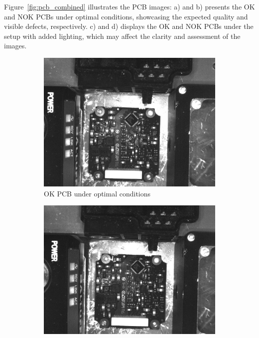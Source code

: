 \documentclass[12pt,DIV14,BCOR12mm,a4paper,footinclude=false,headinclude,parskip=half-,twoside,openright,cleardoublepage=empty,toc=index,bibliography=totoc,listof=totoc]{scrreprt}
\numberwithin{equation}{chapter}
\begin{document}
Figure~\ref{fig:pcb_combined} illustrates the PCB images: a) and b) presents the OK and NOK PCBs under optimal conditions, showcasing the expected quality and visible defects, respectively. c) and d) displays the OK and NOK PCBs under the setup with added lighting, which may affect the clarity and assessment of the images.
\begin{figure}
    \centering
    \begin{subfigure}[b]{0.45\textwidth}
        \centering
        \includegraphics[scale=0.15]{../media/PCB-optimal-OK.png}
        \caption{OK PCB under optimal conditions}
        \label{fig:pcb_optimal_ok}
    \end{subfigure}
    \hfill
    \begin{subfigure}[b]{0.45\textwidth}
        \centering
        \includegraphics[scale=0.15]{../media/PCB-optimal-NOK.png}

\end{subfigure}
\end{figure}
\end{document}
